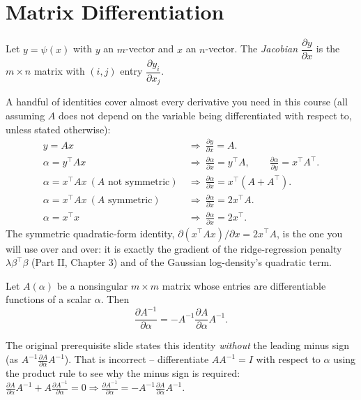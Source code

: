 \documentclass[11pt]{article}
\begin{document}
\section{Matrix Differentiation}

\begin{definition}[Jacobian]
Let $y = \psi(x)$ with $y$ an $m$-vector and $x$ an $n$-vector. The
\emph{Jacobian} $\dfrac{\partial y}{\partial x}$ is the $m\times n$ matrix
with $(i,j)$ entry $\dfrac{\partial y_i}{\partial x_j}$.
\end{definition}

A handful of identities cover almost every derivative you need in this
course (all assuming $A$ does not depend on the variable being
differentiated with respect to, unless stated otherwise):
\begin{align*}
  y = Ax &\ \Rightarrow\ \frac{\partial y}{\partial x} = A. \\
  \alpha = y^\top A x &\ \Rightarrow\ \frac{\partial \alpha}{\partial x}
    = y^\top A, \qquad \frac{\partial \alpha}{\partial y} = x^\top A^\top. \\
  \alpha = x^\top A x \ (A\text{ not symmetric}) &\ \Rightarrow\
    \frac{\partial \alpha}{\partial x} = x^\top (A + A^\top). \\
  \alpha = x^\top A x \ (A\text{ symmetric}) &\ \Rightarrow\
    \frac{\partial \alpha}{\partial x} = 2x^\top A. \\
  \alpha = x^\top x &\ \Rightarrow\ \frac{\partial \alpha}{\partial x} = 2x^\top.
\end{align*}
The symmetric quadratic-form identity, $\partial(x^\top A x)/\partial x =
2x^\top A$, is the one you will use over and over: it is exactly the
gradient of the ridge-regression penalty $\lambda \beta^\top \beta$ (Part
II, Chapter 3) and of the Gaussian log-density's quadratic term.

\begin{theorem}
Let $A(\alpha)$ be a nonsingular $m\times m$ matrix whose entries are
differentiable functions of a scalar $\alpha$. Then
\[
  \frac{\partial A^{-1}}{\partial \alpha}
  = -A^{-1} \frac{\partial A}{\partial \alpha} A^{-1}.
\]
\end{theorem}

\begin{editorialnote}
The original prerequisite slide states this identity \emph{without} the
leading minus sign (as $A^{-1}\frac{\partial A}{\partial\alpha}A^{-1}$).
That is incorrect -- differentiate $AA^{-1}=I$ with respect to $\alpha$
using the product rule to see why the minus sign is required:
$\frac{\partial A}{\partial\alpha}A^{-1} + A\frac{\partial
A^{-1}}{\partial\alpha} = 0 \Rightarrow \frac{\partial
A^{-1}}{\partial\alpha} = -A^{-1}\frac{\partial A}{\partial\alpha}A^{-1}$.
\end{editorialnote}
\end{document}
